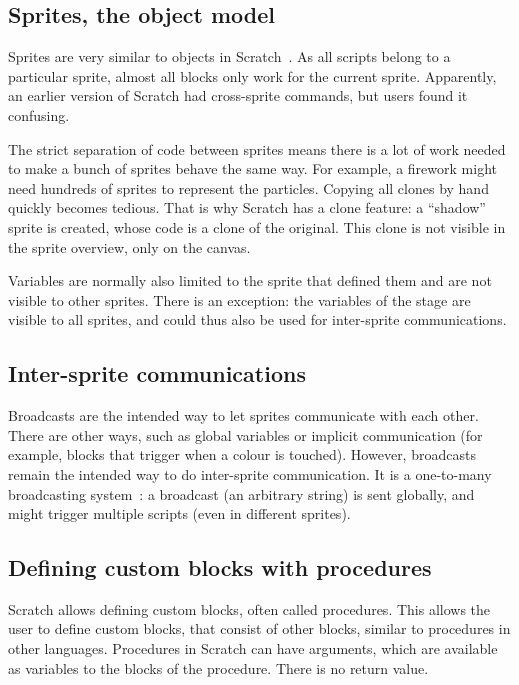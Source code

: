 \documentclass[../main]{subfiles}
\begin{document}
\subsection{Sprites, the object model}\label{subsec:sprites-the-object-model}

Sprites are very similar to objects in Scratch~\autocite{maloneyScratchProgrammingLanguage2010a}.
As all scripts belong to a particular sprite, almost all blocks only work for the current sprite.
Apparently, an earlier version of Scratch had cross-sprite commands, but users found it confusing.

The strict separation of code between sprites means there is a lot of work needed to make a bunch of sprites behave the same way.
For example, a firework might need hundreds of sprites to represent the particles.
Copying all clones by hand quickly becomes tedious.
That is why Scratch has a clone feature: a ``shadow'' sprite is created, whose code is a clone of the original.
This clone is not visible in the sprite overview, only on the canvas.

Variables are normally also limited to the sprite that defined them and are not visible to other sprites.
There is an exception: the variables of the stage are visible to all sprites, and could thus also be used for inter-sprite communications.

\subsection{Inter-sprite communications}\label{subsec:intersprite-communications}

\textcolor{screvent}{Broadcasts} are the intended way to let sprites communicate with each other.
There are other ways, such as global variables or implicit communication (for example, blocks that trigger when a colour is touched).
However, broadcasts remain the intended way to do inter-sprite communication.
It is a one-to-many broadcasting system~\autocite{maloneyScratchProgrammingLanguage2010a}: a broadcast (an arbitrary string) is sent globally, and might trigger multiple scripts (even in different sprites).

\subsection{Defining custom blocks with procedures}\label{subsec:defining-custom-blocks-with-procedures}

Scratch allows defining \textcolor{scrmoreblocks}{custom blocks}, often called procedures.
This allows the user to define custom blocks, that consist of other blocks, similar to procedures in other languages.
Procedures in Scratch can have arguments, which are available as variables to the blocks of the procedure.
There is no return value.
\end{document}
